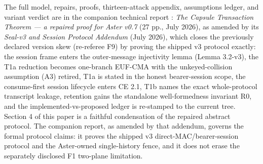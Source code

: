 \documentclass[
  11pt,
]{article}
\begin{document}
The full model, repairs, proofs, thirteen-attack appendix, assumptions ledger, and variant verdict are in the companion technical report \cite{ctt2026}: \emph{The Capsule Transaction Theorem --- a repaired proof for Aster v0.7} (27 pp., July 2026), as amended by its \emph{Seal-v3 and Session Protocol Addendum} (July 2026), which closes the previously declared version skew (re-referee F9) by proving the shipped v3 protocol exactly: the session frame enters the outer-message injectivity lemma (Lemma 3.2-v3), the T1a reduction becomes one-branch EUF-CMA with the unkeyed-collision assumption (A3) retired, T1a is stated in the honest bearer-session scope, the consume-first session lifecycle enters CE 2.1, T1b names the exact whole-protocol transcript leakage, retention gains the standalone well-formedness invariant R0, and the implemented-vs-proposed ledger is re-stamped to the current tree. Section 4 of this paper is a faithful condensation of the repaired abstract protocol. The companion report, as amended by that addendum, governs the formal protocol claims: it proves the shipped v3 direct-MAC/bearer-session protocol and the Aster-owned single-history fence, and it does not erase the separately disclosed F1 two-plane limitation.



\end{document}
